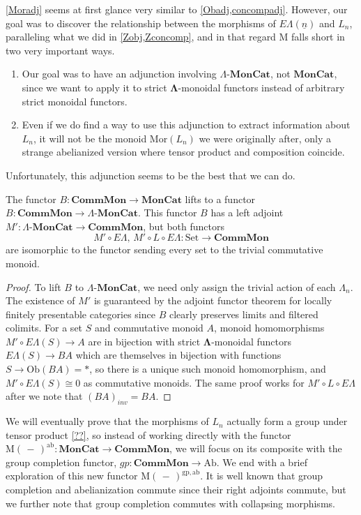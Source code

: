 \documentclass{amsbook} %
\newcommand{\mb}{\mathbf}
\newcommand{\Set}{\ensuremath{\textrm{Set}}}
\newcommand{\ML}{\mathbf{\Lambda}}
\newcommand{\EL}{E\Lambda}
\newcommand{\ELn}{E\Lambda(\underline{n})}
\newcommand{\ob}{\textrm{Ob}}
\newcommand{\lmc}{\Lambda\mbox{-}\mb{MonCat}}
\newcommand{\sets}{\Set}
\newcommand{\cmon}{\ensuremath{\mb{CommMon}}}
\newcommand{\moncat}{\ensuremath{\mb{MonCat}}}
\numberwithin{section}{chapter}
\begin{document}
\cref{Moradj} seems at first glance very similar to \cref{Obadj,concompadj}. However, our goal was to discover the relationship between the morphisms of $\ELn$ and $L_n$, paralleling what we did in \cref{Zobj,Zconcomp}, and in that regard $\mathrm{M}$ falls short in two very important ways. 

\begin{enumerate}
\item Our goal was to have an adjunction involving $\lmc$, not $\moncat$, since we want to apply it to strict $\ML$-monoidal functors instead of arbitrary strict monoidal functors. 
\item Even if we do find a way to use this adjunction to extract information about $L_n$, it will not be the monoid $\mathrm{Mor}(L_n)$ we were originally after, only a strange abelianized version where tensor product and composition coincide.  
\end{enumerate} 

Unfortunately, this adjunction seems to be the best that we can do. 
\begin{prop}
The functor $B:\cmon \to \moncat$ lifts to a functor $B:\cmon \to \lmc$. This functor $B$ has a left adjoint $M':\lmc \to \cmon$, but both functors
\[
M' \circ \EL, \, M' \circ L \circ \EL : \sets \to \cmon
\]
are isomorphic to the functor sending every set to the trivial commutative monoid.
\end{prop}
\begin{proof}
To lift $B$ to $\lmc$, we need only assign the trivial action of each $\Lambda_n$. The existence of $M'$ is guaranteed by the adjoint functor theorem for locally finitely presentable categories since $B$ clearly preserves limits and filtered colimits.  For a set $S$ and commutative monoid $A$, monoid homomorphisms $M' \circ \EL(S) \to A$ are in bijection with strict $\ML$-monoidal functors $\EL(S) \to BA$ which are themselves in bijection with functions $S \to \ob(BA) = *$, so there is a unique such monoid homomorphism, and $M' \circ \EL(S) \cong 0$ as commutative monoids. The same proof works for $M' \circ L \circ \EL$ after we note that $(BA)_{inv} = BA$.
\end{proof}





 We will eventually prove that the morphisms of $L_n$ actually form a group under tensor product \cref{??}, so instead of working directly with the functor $\mathrm{M}(\, - \,)^{\mathrm{ab}}: \moncat \to \cmon$, we will focus on its composite with the group completion functor, $gp : \cmon \to \mathrm{Ab}$. We end with a brief exploration of this new functor $\mathrm{M}(\, - \,)^{\mathrm{gp},\mathrm{ab}}$.  
It is well known that group completion and abelianization commute since their right adjoints commute, but we further note that group completion commutes with collapsing morphisms.
\end{document}
